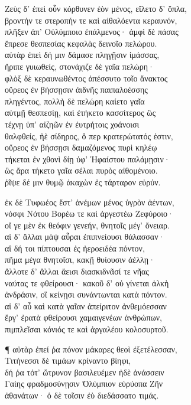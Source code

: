 \quad{}Ζεὺς δ' ἐπεὶ οὖν κόρθυνεν ἑὸν μένος, εἵλετο δ' ὅπλα,\\
βροντήν τε στεροπήν τε καὶ αἰθαλόεντα κεραυνόν,\\
πλῆξεν ἀπ' Οὐλύμποιο ἐπάλμενος· ἀμφὶ δὲ πάσας \\
ἔπρεσε θεσπεσίας κεφαλὰς δεινοῖο πελώρου.\\
αὐτὰρ ἐπεὶ δή μιν δάμασε πληγῇσιν ἱμάσσας,\\
ἤριπε γυιωθείς, στονάχιζε δὲ γαῖα πελώρη· \\
φλὸξ δὲ κεραυνωθέντος ἀπέσσυτο τοῖο ἄνακτος\\
οὔρεος ἐν βήσσῃσιν ἀιδνῆς παιπαλοέσσης \\
πληγέντος, πολλὴ δὲ πελώρη καίετο γαῖα \\
αὐτμῇ θεσπεσίῃ, καὶ ἐτήκετο κασσίτερος ὣς\\
τέχνῃ ὑπ' αἰζηῶν ἐν ἐυτρήτοις χοάνοισι\\
θαλφθείς, ἠὲ σίδηρος, ὅ περ κρατερώτατός ἐστιν, \\
οὔρεος ἐν βήσσῃσι δαμαζόμενος πυρὶ κηλέῳ \\
τήκεται ἐν χθονὶ δίῃ ὑφ' Ἡφαίστου παλάμῃσιν· \\
ὣς ἄρα τήκετο γαῖα σέλαι πυρὸς αἰθομένοιο.\\
ῥῖψε δέ μιν θυμῷ ἀκαχὼν ἐς τάρταρον εὐρύν. 

\quad{}ἐκ δὲ Τυφωέος ἔστ' ἀνέμων μένος ὑγρὸν ἀέντων,\\
νόσφι Νότου Βορέω τε καὶ ἀργεστέω Ζεφύροιο· \\
οἵ γε μὲν ἐκ θεόφιν γενεήν, θνητοῖς μέγ' ὄνειαρ.\\
αἱ δ' ἄλλαι μὰψ αὖραι ἐπιπνείουσι θάλασσαν·\\
αἳ δή τοι πίπτουσαι ἐς ἠεροειδέα πόντον,\\
πῆμα μέγα θνητοῖσι, κακῇ θυίουσιν ἀέλλῃ· \\
ἄλλοτε δ' ἄλλαι ἄεισι διασκιδνᾶσί τε νῆας \\
ναύτας τε φθείρουσι· κακοῦ δ' οὐ γίνεται ἀλκὴ \\
ἀνδράσιν, οἳ κείνῃσι συνάντωνται κατὰ πόντον. \\
αἱ δ' αὖ καὶ κατὰ γαῖαν ἀπείριτον ἀνθεμόεσσαν\\
ἔργ' ἐρατὰ φθείρουσι χαμαιγενέων ἀνθρώπων, \\
πιμπλεῖσαι κόνιός τε καὶ ἀργαλέου κολοσυρτοῦ. 

¶ αὐτὰρ ἐπεί ῥα πόνον μάκαρες θεοὶ ἐξετέλεσσαν, \\
Τιτήνεσσι δὲ τιμάων κρίναντο βίηφι,\\
δή ῥα τότ' ὤτρυνον βασιλευέμεν ἠδὲ ἀνάσσειν\\
Γαίης φραδμοσύνῃσιν Ὀλύμπιον εὐρύοπα Ζῆν\\
ἀθανάτων· ὁ δὲ τοῖσιν ἐὺ διεδάσσατο τιμάς. 

